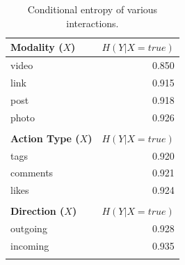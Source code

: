 \begin{table}
\caption{Conditional entropy of various interactions.}
\label{table:ce_interaction}
\vspace{-2mm}
\centering
{\footnotesize
	\begin{tabular}{| >{\small}l | >{\small}r | }
		\hline
		\textbf{ Modality ($X$)} & $H(Y|X=true)$ \\
		\hline
		{ video } & 0.850 \\
		\hline
		{ link } & 0.915 \\
		\hline
		{ post } & 0.918 \\
		\hline
		{ photo } & 0.926 \\
		\hline
\multicolumn{2}{c}{}\\
		\hline
		\textbf{Action Type ($X$)}  & $H(Y|X=true)$ \\
		\hline
		{ tags }  &  0.920 \\
		\hline
		{ comments }  &  0.921 \\
		\hline
		{ likes }  &  0.924 \\
		\hline
\multicolumn{2}{c}{}\\
		\hline
		\textbf{ Direction ($X$) } & $H(Y|X=true)$ \\
		\hline
		{ outgoing }  &  0.928 \\
		\hline
		{ incoming }  &  0.935 \\
		\hline
\multicolumn{2}{c}{}\\
%	

\end{tabular}}
\end{table}
